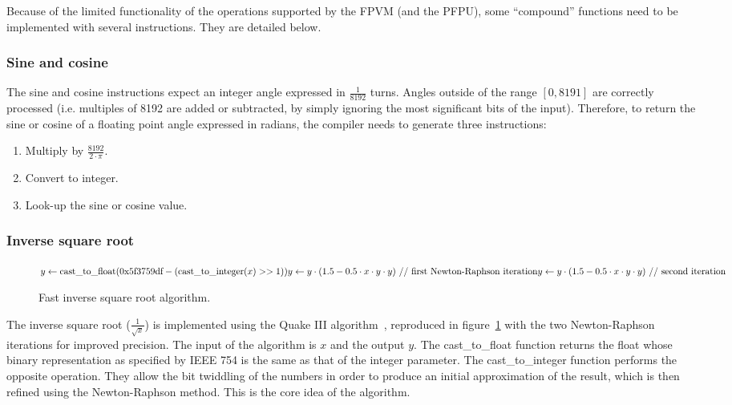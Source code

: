 \documentclass[a4paper,11pt]{kthesis}
\begin{document}
Because of the limited functionality of the operations supported by the FPVM (and the PFPU), some ``compound'' functions need to be implemented with several instructions. They are detailed below.

\subsubsection{Sine and cosine}
The sine and cosine instructions expect an integer angle expressed in $\frac{1}{8192}$ turns. Angles outside of the range $[0, 8191]$ are correctly processed (i.e. multiples of 8192 are added or subtracted, by simply ignoring the most significant bits of the input). Therefore, to return the sine or cosine of a floating point angle expressed in radians, the compiler needs to generate three instructions:
\begin{enumerate}
\item Multiply by $\frac{8192}{2 \cdot \pi}$.
\item Convert to integer.
\item Look-up the sine or cosine value.
\end{enumerate}

\subsubsection{Inverse square root}
\begin{figure}
\centering
\begin{boxedminipage}{13cm}
\begin{math}
y \leftarrow \textrm{cast\_to\_float}(\textrm{0x5f3759df} - (\textrm{cast\_to\_integer}(x) >> 1)) \\
y \leftarrow y \cdot (1.5 - 0.5 \cdot x \cdot y \cdot y)\textrm{ // first Newton-Raphson iteration} \\
y \leftarrow y \cdot (1.5 - 0.5 \cdot x \cdot y \cdot y)\textrm{ // second iteration}
\end{math}
\end{boxedminipage}
\caption{Fast inverse square root algorithm.}
\label{fig:invsqrt}
\end{figure}

The inverse square root ($\frac{1}{\sqrt{x}}$) is implemented using the Quake III algorithm~\cite{invsqrt}, reproduced in figure~\ref{fig:invsqrt} with the two Newton-Raphson iterations for improved precision. The input of the algorithm is $x$ and the output $y$. The cast\_to\_float function returns the float whose binary representation as specified by IEEE 754 is the same as that of the integer parameter. The cast\_to\_integer function performs the opposite operation. They allow the bit twiddling of the numbers in order to produce an initial approximation of the result, which is then refined using the Newton-Raphson method. This is the core idea of the algorithm.
\end{document}
